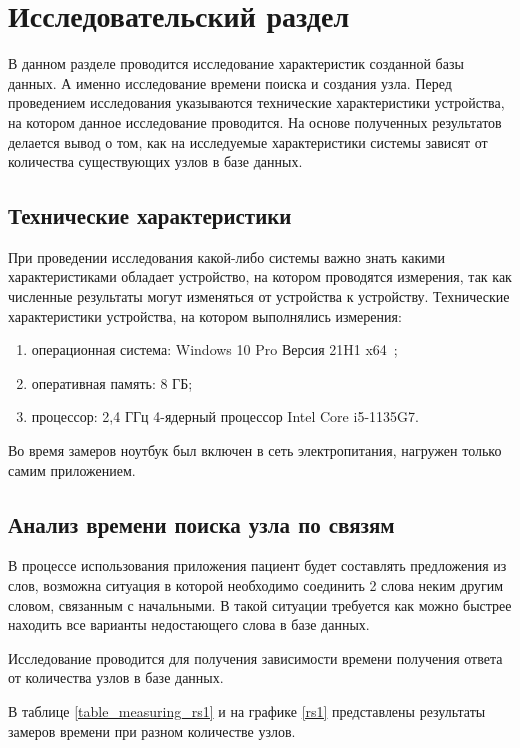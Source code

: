 \chapter{Исследовательский раздел}

В данном разделе проводится исследование характеристик созданной базы данных. А именно исследование времени поиска и создания узла. Перед проведением исследования указываются технические характеристики устройства, на котором данное исследование проводится. На основе полученных результатов делается вывод о том, как на исследуемые характеристики системы зависят от количества существующих узлов в базе данных.

\section{Технические характеристики}

При проведении исследования какой-либо системы важно знать какими характеристиками обладает устройство, на котором проводятся измерения, так как численные результаты могут изменяться от устройства к устройству.
Технические характеристики устройства, на котором выполнялись измерения:

\begin{enumerate}
	\item операционная система: Windows 10 Pro Версия 21H1 x64~\cite{oswindows};
	\item оперативная память: 8 ГБ;
	\item процессор: 2,4 ГГц 4-ядерный процессор Intel Core i5-1135G7\cite{intel}.
\end{enumerate}

Во время замеров ноутбук был включен в сеть электропитания, нагружен
только самим приложением.

\section{Анализ времени поиска узла по связям}

В процессе использования приложения пациент будет составлять предложения из слов, возможна ситуация в которой необходимо соединить 2 слова неким другим словом, связанным с начальными.
В такой ситуации требуется как можно быстрее находить все варианты недостающего слова в базе данных.

Исследование проводится для получения зависимости времени получения ответа от количества узлов в базе данных.

В таблице \ref{table_measuring_rs1} и на графике \ref{rs1} представлены результаты замеров времени при разном количестве узлов.

